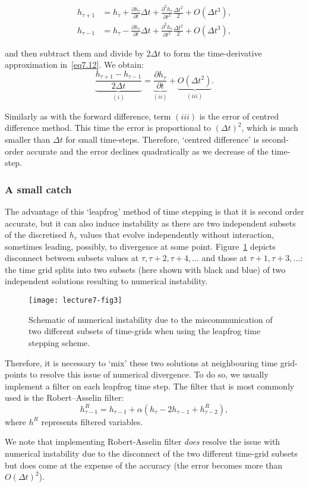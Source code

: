 \begin{align}
	h_{\tau+1}&=h_{\tau}+\frac{\partial h_{\tau}}{\partial t}\Delta t+\frac{\partial^{2}h_{\tau}}{\partial t^{2}}\frac{\Delta t^{2}}{2}+O(\Delta t^{3}),\\
	h_{\tau-1}&=h_{\tau}-\frac{\partial h_{\tau}}{\partial t}\Delta t +\frac{\partial^{2} h_{\tau}}{\partial t^{2}}\frac{\Delta t^2}{2}+O(\Delta t^{3}),
\end{align}

and then subtract them and divide by $2\Delta t$ to form the time-derivative approximation in~\eqref{eq7.12}. We obtain: 
\begin{equation}
	\underbrace{\frac{h_{\tau+1}-h_{\tau-1}}{2\Delta t}}_{(i)}=\underbrace{\frac{\partial h_{\tau}}{\partial t}}_{(ii)}+\underbrace{O(\Delta t^{2})}_{(iii)}.
\label{SOA}
\end{equation}

Similarly as with the forward difference, term $(iii)$ is the error of centred difference method. This time the error is proportional to $(\Delta t)^2$, which is much smaller than $\Delta t$ for small time-steps. Therefore, `centred difference' is second-order accurate and the error declines quadratically as we decrease of the time-step. 

\subsubsection*{A small catch}

The advantage of this `leapfrog' method of time stepping is that it is second order accurate, but it can also induce instability as there are two independent  subsets of the discretised $h_{\tau}$ values that evolve independently without interaction, sometimes leading, possibly, to divergence at some point. Figure~\ref{leapfrog} depicts disconnect between subsets values at $\tau, \tau+2,\tau+4, \dots$ and those at $\tau+1, \tau+3, \dots$: the time grid splits into two subsets (here shown with black and blue) of two independent solutions resulting to numerical instability.

\begin{figure}[h!]
\centering
\texttt{[image: lecture7-fig3]}
\caption{Schematic of numerical instability due to the miscommunication of two different subsets of time-grids when using the leapfrog time stepping scheme.}
\label{leapfrog}
\end{figure}

Therefore, it is necessary to `mix' these two solutions at neighbouring time grid-points to resolve this issue of numerical divergence. To do so, we usually implement a filter on each leapfrog time step. The filter that is  most commonly used is the Robert--Asselin filter:
\begin{equation}
h_{\tau-1}^{R}=h_{\tau-1}+\alpha(h_{\tau}-2h_{\tau-1}+h_{\tau-2}^{R}),
\end{equation}
where $h^{R}$ represents filtered variables. 

We note that implementing Robert-Asselin filter \emph{does} resolve the issue with numerical instability due to the disconnect of the two different time-grid subsets but does come at the expense of the accuracy (the error becomes more than $O(\Delta t)^2$). 
